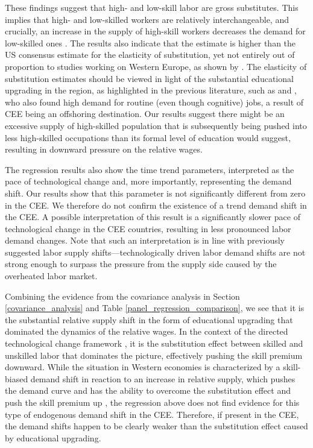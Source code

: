 \documentclass[11pt]{article}
\begin{document}
These findings suggest that high- and low-skill labor are gross substitutes. This implies that high- and low-skilled workers are relatively interchangeable, and crucially, an increase in the supply of high-skill workers decreases the demand for low-skilled ones \citep{havranek2020elasticity}. The results also indicate that the estimate is higher than the US consensus estimate for the elasticity of substitution, yet not entirely out of proportion to studies working on Western Europe, as shown by \cite{havranek2020elasticity}. The elasticity of substitution estimates should be viewed in light of the substantial educational upgrading in the region, as highlighted in the previous literature, such as \citet{arendt2019technical} and \citet{hardy2018educational}, who also found high demand for routine (even though cognitive) jobs, a result of CEE being an offshoring destination. Our results suggest there might be an excessive supply of high-skilled population that is subsequently being pushed into less high-skilled occupations than its formal level of education would suggest, resulting in downward pressure on the relative wages.

The regression results also show the time trend parameters, interpreted as the pace of technological change and, more importantly, representing the demand shift. Our results show that this parameter is not significantly different from zero in the CEE. We therefore do not confirm the existence of a trend demand shift in the CEE. A possible interpretation of this result is a significantly slower pace of technological change in the CEE countries, resulting in less pronounced labor demand changes. Note that such an interpretation is in line with previously suggested labor supply shifts—technologically driven labor demand shifts are not strong enough to surpass the pressure from the supply side caused by the overheated labor market.


Combining the evidence from the covariance analysis in Section \ref{covariance_analysis} and Table \ref{panel_regression_comparison}, we see that it is the substantial relative supply shift in the form of educational upgrading that dominated the dynamics of the relative wages. In the context of the directed technological change framework \citep{acemoglu2002directed}, it is the substitution effect between skilled and unskilled labor that dominates the picture, effectively pushing the skill premium downward. While the situation in Western economies is characterized by a skill-biased demand shift in reaction to an increase in relative supply, which pushes the demand curve and has the ability to overcome the substitution effect and push the skill premium up \citep{acemoglu2002directed}, the regression above does not find evidence for this type of endogenous demand shift in the CEE. Therefore, if present in the CEE, the demand shifts happen to be clearly weaker than the substitution effect caused by educational upgrading.
\end{document}
